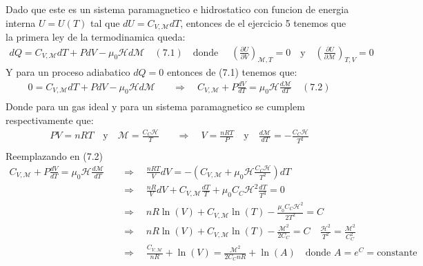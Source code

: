 \documentclass[a4paper]{article}
\begin{document}
\begin{answer}[Punto 6]
    \end{answer}
    
    \begin{answer}[Punto 7]
        Dado que este es un sistema paramagnetico e hidrostatico  con funcion de energia interna $U = U(T)$ tal que $dU = C_{V, \mathscr{M}} dT$, entonces de el ejercicio 5 tenemos que la primera ley de la termodinamica queda:
        \begin{align*}
            dQ = C_{V, \mathscr{M}} dT + PdV - \mu_0 \mathscr{H} d\mathscr{M} \quad (7.1) \quad \text{donde } \quad \left(\frac{\partial U}{\partial V}\right)_{\mathscr{M},T} = 0 \quad \text{y} \quad \left(\frac{\partial U}{\partial \mathscr{M}}\right)_{T,V} = 0 
        \end{align*}
        Y para un proceso adiabatico $dQ = 0$ entonces de (7.1) tenemos que:
        \begin{align*}
            0 = C_{V, \mathscr{M}} dT + PdV - \mu_0 \mathscr{H} d\mathscr{M} \quad &\Rightarrow \quad C_{V, \mathscr{M}} + P\frac{dV}{dT}= \mu_0 \mathscr{H}\frac{d\mathscr{M}}{dT} \quad (7.2)\\
        \end{align*}
        Donde para un gas ideal y para un sistema paramagnetico se cumplem respectivamente que:
        \begin{align*}
            PV = nRT \quad \text{y} \quad \mathscr{M} = \frac{C_C \mathscr{H}}{T} \quad &\Rightarrow \quad V = \frac{nRT}{P} \quad \text{y} \quad \frac{d\mathscr{M}}{dT} = -\frac{C_C\mathscr H}{T^2}\\
        \end{align*}
        Reemplazando en (7.2)
        \begin{align*}
            C_{V, \mathscr{M}} + P\frac{dV}{dT}= \mu_0 \mathscr{H}\frac{d\mathscr{M}}{dT} \quad &\Rightarrow \quad \frac{nRT}{V} dV =  -\left( C_{V,\mathscr M} +  \mu_0 \mathscr H\frac{C_C\mathscr H}{T^2} \right)dT\\
            & \Rightarrow \quad \frac{nR}{V} dV + C_{V,\mathscr M}\frac{dT}{T}  +  \mu_0C_C\mathscr H^2 \frac{dT}{T^3} = 0\\ 
            & \Rightarrow \quad nR \ln(V) + C_{V,\mathscr M} \ln(T) -  \frac{\mu_0 C_C\mathscr H^2 }{2T^2}  = C\\ 
            & \Rightarrow \quad nR \ln(V) + C_{V,\mathscr M} \ln(T) -  \frac{\mathscr{M}^2 }{2 C_C}  = C \quad  \frac{\mathscr{H}^2}{T^2} = \frac{ \mathscr{M}^2}{C_C^2}\\
            & \Rightarrow \quad \frac{C_{V,\mathscr M}}{nR} + \ln(V)  = \frac{\mathscr{M}^2}{2 C_C nR} + \ln(A) \quad \text{donde } A = e^C = \text{constante}\\
        \end{align*}

    \end{answer}
\end{document}
